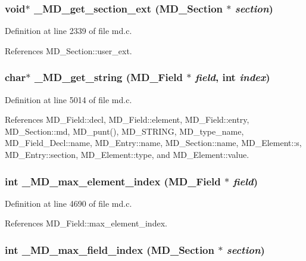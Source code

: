 \subsubsection{\setlength{\rightskip}{0pt plus 5cm}void$\ast$ \_\-MD\_\-get\_\-section\_\-ext (\bf{MD\_\-Section} $\ast$ {\em section})}\label{md_8h_72ad4026d2364185ce238f2bee2a62a5}




Definition at line 2339 of file md.c.

References MD\_\-Section::user\_\-ext.
\subsubsection{\setlength{\rightskip}{0pt plus 5cm}char$\ast$ \_\-MD\_\-get\_\-string (\bf{MD\_\-Field} $\ast$ {\em field}, int {\em index})}\label{md_8h_74fa33246115a2b9e727b11d2783feb2}




Definition at line 5014 of file md.c.

References MD\_\-Field::decl, MD\_\-Field::element, MD\_\-Field::entry, MD\_\-Section::md, MD\_\-punt(), MD\_\-STRING, MD\_\-type\_\-name, MD\_\-Field\_\-Decl::name, MD\_\-Entry::name, MD\_\-Section::name, MD\_\-Element::s, MD\_\-Entry::section, MD\_\-Element::type, and MD\_\-Element::value.
\subsubsection{\setlength{\rightskip}{0pt plus 5cm}int \_\-MD\_\-max\_\-element\_\-index (\bf{MD\_\-Field} $\ast$ {\em field})}\label{md_8h_a9c7f86c59d6fb77e8822c00293520ea}




Definition at line 4690 of file md.c.

References MD\_\-Field::max\_\-element\_\-index.
\subsubsection{\setlength{\rightskip}{0pt plus 5cm}int \_\-MD\_\-max\_\-field\_\-index (\bf{MD\_\-Section} $\ast$ {\em section})}\label{md_8h_4e2d0c00831d31248181c8fc6fbc0ed9}




